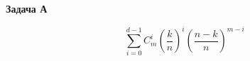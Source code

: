 \documentclass[a4paper,12pt,preview]{article} %
\begin{document}
	\begin{center}
		\huge\textbf{Задача А}
	\end{center}

	\begin{equation}
		\sum_{i=0}^{d-1} C_{m}^{i} (\frac{k}{n})^i (\frac{n-k}{n})^{m-i}
	\end{equation}
\end{document}
